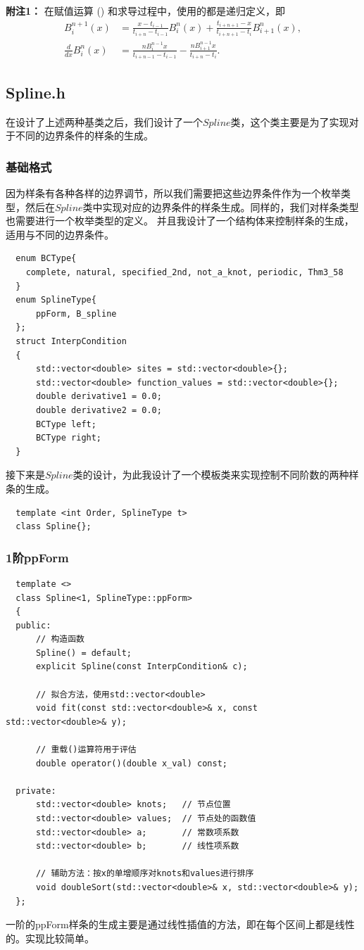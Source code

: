 \documentclass[a4paper]{article}
\begin{document}
\textbf{附注1：} 在赋值运算 () 和求导过程中，使用的都是递归定义，即
\begin{align*}
    B_i^{n+1}(x) & = \frac{x - t_{i-1}}{t_{i+n} - t_{i-1}} B_i^n(x) +
    \frac{t_{i+n+1} - x}{t_{i+n+1} - t_i} B_{i+1}^n(x), \\
    \frac{d}{dx} B_i^n(x) & = \frac{nB_i^{n-1}x}{t_{i+n-1} - t_{i-1}}
    - \frac{nB_{i+1}^{n-1}x}{t_{i+n} - t_{i}}.
\end{align*}

\subsection*{\textbf{Spline.h}}
在设计了上述两种基类之后，我们设计了一个$Spline$类，这个类主要是为了实现对于不同的边界条件的样条的生成。
\subsubsection*{\textbf{基础格式}}
因为样条有各种各样的边界调节，所以我们需要把这些边界条件作为一个枚举类型，然后在$Spline$类中实现对应的边界条件的样条生成。同样的，我们对样条类型也需要进行一个枚举类型的定义。
并且我设计了一个结构体来控制样条的生成，适用与不同的边界条件。
\begin{lstlisting}
  enum BCType{
    complete, natural, specified_2nd, not_a_knot, periodic, Thm3_58
  }
  enum SplineType{
      ppForm, B_spline
  };
  struct InterpCondition
  {
      std::vector<double> sites = std::vector<double>{};
      std::vector<double> function_values = std::vector<double>{};
      double derivative1 = 0.0;
      double derivative2 = 0.0;
      BCType left;
      BCType right;
  }
\end{lstlisting}
接下来是$Spline$类的设计，为此我设计了一个模板类来实现控制不同阶数的两种样条的生成。
\begin{lstlisting}
  template <int Order, SplineType t>
  class Spline{};
\end{lstlisting}
\subsubsection*{\textbf{1阶ppForm}}
\begin{lstlisting}
  template <>
  class Spline<1, SplineType::ppForm>
  {
  public:
      // 构造函数
      Spline() = default;
      explicit Spline(const InterpCondition& c);

      // 拟合方法，使用std::vector<double>
      void fit(const std::vector<double>& x, const std::vector<double>& y);

      // 重载()运算符用于评估
      double operator()(double x_val) const;

  private:
      std::vector<double> knots;   // 节点位置
      std::vector<double> values;  // 节点处的函数值
      std::vector<double> a;       // 常数项系数
      std::vector<double> b;       // 线性项系数

      // 辅助方法：按x的单增顺序对knots和values进行排序
      void doubleSort(std::vector<double>& x, std::vector<double>& y);
  };
\end{lstlisting}
一阶的ppForm样条的生成主要是通过线性插值的方法，即在每个区间上都是线性的。实现比较简单。
\end{document}
